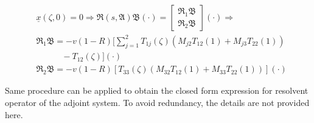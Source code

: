 \begin{equation} \label{eq:resolvent_u}
\begin{aligned}
    &\underline{x}(\zeta,0) = 0 \Rightarrow \mathfrak{R}(s, \mathfrak{A}) \mathfrak{B} (\cdot) = \begin{bmatrix}
        \mathfrak{R}_{1} \mathfrak{B}\\
        \mathfrak{R}_{2} \mathfrak{B}
    \end{bmatrix} (\cdot) \Rightarrow\\
    &\mathfrak{R}_{1} \mathfrak{B} = -v(1-R) \bigl[ \sum_{j=1}^{2} T_{1j}(\zeta) (M_{j2} T_{12}(1) + M_{j3} T_{22}(1)) \\
    &\hspace{3em} - T_{12}(\zeta) \bigr] (\cdot)\\
    &\mathfrak{R}_{2} \mathfrak{B} = -v(1-R) \left[ T_{33}(\zeta) (M_{32} T_{12}(1) + M_{33} T_{22}(1)) \right] (\cdot)
\end{aligned}
\end{equation}

Same procedure can be applied to obtain the closed form expression for resolvent operator of the adjoint system. To avoid redundancy, the details are not provided here.